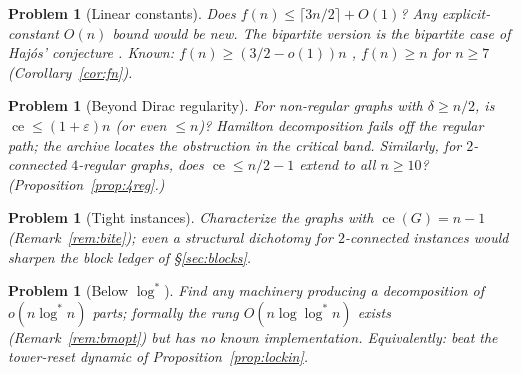 \documentclass[a4paper,11pt]{amsart}
\newtheorem{problem}[theorem]{Problem}
\theoremstyle{definition}
\theoremstyle{remark}
\newcommand{\ce}{\operatorname{ce}}
\begin{document}
\begin{problem}[Linear constants]
Does $f(n)\le\lceil3n/2\rceil+O(1)$? Any explicit-constant $O(n)$ bound would be new. The bipartite version
is the bipartite case of Haj\'os' conjecture \cite{HNS17}. Known: $f(n)\ge(3/2-o(1))n$
\cite{E83,BM22}, $f(n)\ge n$ for $n\ge7$ (Corollary~\ref{cor:fn}).
\end{problem}

\begin{problem}[Beyond Dirac regularity]
For non-regular graphs with $\delta\ge n/2$, is $\ce\le(1+\varepsilon)n$ (or even $\le n$)? Hamilton
decomposition fails off the regular path; the archive locates the obstruction in the critical band.
Similarly, for $2$-connected $4$-regular graphs, does $\ce\le n/2-1$ extend to all $n\ge10$?
(Proposition~\ref{prop:4reg}.)
\end{problem}

\begin{problem}[Tight instances]
Characterize the graphs with $\ce(G)=n-1$ (Remark~\ref{rem:bite}); even a structural dichotomy for
$2$-connected instances would sharpen the block ledger of \S\ref{sec:blocks}.
\end{problem}

\begin{problem}[Below $\log^*$]
Find any machinery producing a decomposition of $o(n\log^* n)$ parts; formally the rung
$O(n\log\log^*n)$ exists (Remark~\ref{rem:bmopt}) but has no known implementation. Equivalently: beat the
tower-reset dynamic of Proposition~\ref{prop:lockin}.
\end{problem}
\end{document}
